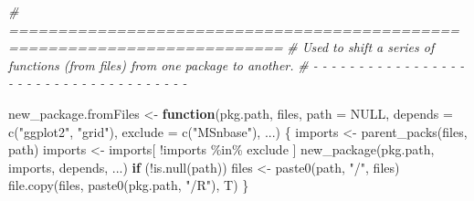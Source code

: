 \documentclass[
]{article}
\newenvironment{Shaded}{\begin{snugshade}}{\end{snugshade}}
\newcommand{\AttributeTok}[1]{\textcolor[rgb]{0.77,0.63,0.00}{#1}}
\newcommand{\CommentTok}[1]{\textcolor[rgb]{0.56,0.35,0.01}{\textit{#1}}}
\newcommand{\ConstantTok}[1]{\textcolor[rgb]{0.00,0.00,0.00}{#1}}
\newcommand{\ControlFlowTok}[1]{\textcolor[rgb]{0.13,0.29,0.53}{\textbf{#1}}}
\newcommand{\FunctionTok}[1]{\textcolor[rgb]{0.00,0.00,0.00}{#1}}
\newcommand{\NormalTok}[1]{#1}
\newcommand{\OtherTok}[1]{\textcolor[rgb]{0.56,0.35,0.01}{#1}}
\newcommand{\SpecialCharTok}[1]{\textcolor[rgb]{0.00,0.00,0.00}{#1}}
\newcommand{\StringTok}[1]{\textcolor[rgb]{0.31,0.60,0.02}{#1}}
\begin{document}
\begin{Shaded}
\begin{Highlighting}[]
\CommentTok{\# ==========================================================================}
\CommentTok{\# Used to shift a series of functions (from files) from one package to another.}
\CommentTok{\# {-} {-} {-} {-} {-} {-} {-} {-} {-} {-} {-} {-} {-} {-} {-} {-} {-} {-} {-} {-} {-} {-} {-} {-} {-} {-} {-} {-} {-} {-} {-} {-} {-} {-} {-} {-} {-}}

\NormalTok{new\_package.fromFiles }\OtherTok{\textless{}{-}} \ControlFlowTok{function}\NormalTok{(pkg.path, files, }\AttributeTok{path =} \ConstantTok{NULL}\NormalTok{,}
  \AttributeTok{depends =} \FunctionTok{c}\NormalTok{(}\StringTok{"ggplot2"}\NormalTok{, }\StringTok{"grid"}\NormalTok{),}
  \AttributeTok{exclude =} \FunctionTok{c}\NormalTok{(}\StringTok{"MSnbase"}\NormalTok{),}
\NormalTok{  ...) \{}
\NormalTok{  imports }\OtherTok{\textless{}{-}} \FunctionTok{parent\_packs}\NormalTok{(files, path)}
\NormalTok{  imports }\OtherTok{\textless{}{-}}\NormalTok{ imports[ }\SpecialCharTok{!}\NormalTok{imports }\SpecialCharTok{\%in\%}\NormalTok{ exclude ]}
  \FunctionTok{new\_package}\NormalTok{(pkg.path, imports, depends, ...)}
  \ControlFlowTok{if}\NormalTok{ (}\SpecialCharTok{!}\FunctionTok{is.null}\NormalTok{(path))}
\NormalTok{    files }\OtherTok{\textless{}{-}} \FunctionTok{paste0}\NormalTok{(path, }\StringTok{"/"}\NormalTok{, files)}
  \FunctionTok{file.copy}\NormalTok{(files, }\FunctionTok{paste0}\NormalTok{(pkg.path, }\StringTok{"/R"}\NormalTok{), T)}
\NormalTok{\}}


\end{Highlighting}
\end{Shaded}
\end{document}
